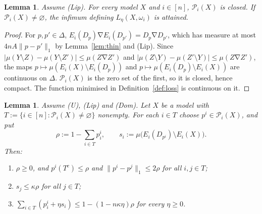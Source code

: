 \documentclass[11pt]{article}
\newtheorem{lemma}[theorem]{Lemma}
\theoremstyle{definition}
\newcommand{\Pc}{\mathcal P}
\newcommand{\sd}{\mathbin{\nabla}}
\begin{document}
\begin{lemma}\label{lem:attain}
Assume (Lip). For every model $X$ and $i\in[n]$, $\Pc_i(X)$ is closed. If $\Pc_i(X)\neq\varnothing$, the infimum defining $L_\eta(X,\omega_i)$ is attained.
\end{lemma}

\begin{proof}
For $p,p'\in\Delta$, $E_i(D_p)\sd E_i(D_{p'})=D_p\sd D_{p'}$, which has measure at most $4nA\|p-p'\|_1$ by Lemma~\ref{lem:thin} and (Lip). Since $|\mu(Y\setminus Z)-\mu(Y\setminus Z')|\le\mu(Z\sd Z')$ and $|\mu(Z\setminus Y)-\mu(Z'\setminus Y)|\le\mu(Z\sd Z')$, the maps $p\mapsto\mu(E_i(X)\setminus E_i(D_p))$ and $p\mapsto\mu(E_i(D_p)\setminus E_i(X))$ are continuous on $\Delta$. $\Pc_i(X)$ is the zero set of the first, so it is closed, hence compact. The function minimised in Definition~\ref{def:loss} is continuous on it.
\end{proof}

\begin{lemma}\label{lem:budget}
Assume (U), (Lip) and (Dom). Let $X$ be a model with $T:=\{i\in[n]:\Pc_i(X)\neq\varnothing\}$ nonempty. For each $i\in T$ choose $p^i\in\Pc_i(X)$, and put
\[
\rho:=1-\sum_{i\in T}p^i_i,\qquad s_i:=\mu\big(E_i(D_{p^i})\setminus E_i(X)\big).
\]
Then:
\begin{enumerate}[label=(\roman*)]
\item $\rho\ge0$, and $p^i(T^c)\le\rho$ and $\|p^i-p^j\|_1\le2\rho$ for all $i,j\in T$;
\item $s_j\le\kappa\rho$ for all $j\in T$;
\item $\sum_{i\in T}(p^i_i+\eta s_i)\le 1-(1-n\kappa\eta)\rho$ for every $\eta\ge0$.
\end{enumerate}
\end{lemma}
\end{document}
